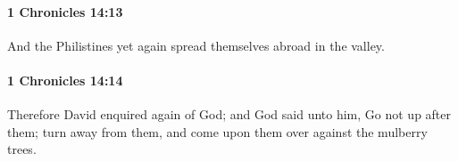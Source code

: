 		\paragraph{1 Chronicles 14:13} %
			\label{1CHRONICLES-14-13}

			And the Philistines yet again spread themselves abroad in the valley.


		\paragraph{1 Chronicles 14:14} %
			\label{1CHRONICLES-14-14}

			Therefore David enquired again of God; and God said unto him, Go not up after them; turn away from them, and come upon them over against the mulberry trees.


